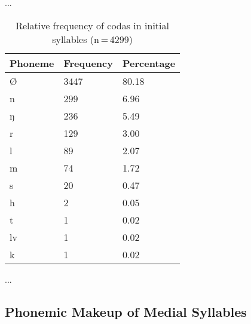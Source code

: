 ...

\begin{table}[hp]\centering
\caption[Relative frequency of codas in initial syllables]{Relative frequency of codas in initial syllables (n\,=\,4299)}
\begin{tabu} to 0.5\textwidth{X X[c] X[c]}
\tableheaderfont\toprule
Phoneme
	& Frequency
	& Percentage
	\\
	
\toprule

Ø
	& 3447
	& 80.18\pct
	\\

\midrule

n
	& 299
	& 6.96\pct
	\\

ŋ
	& 236
	& 5.49\pct
	\\

r
	& 129
	& 3.00\pct
	\\

l
	& 89
	& 2.07\pct
	\\

m
	& 74
	& 1.72\pct
	\\

s
	& 20
	& 0.47\pct
	\\

h
	& 2
	& 0.05\pct
	\\

t
	& 1
	& 0.02\pct
	\\

lv
	& 1
	& 0.02\pct
	\\

k
	& 1
	& 0.02\pct
	\\

\bottomrule
\end{tabu}
\label{tab:initcod}
\end{table}

...


\subsection{Phonemic Makeup of Medial Syllables}

